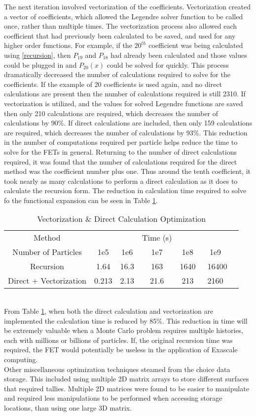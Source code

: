 \documentclass[10tma4paper]{article}
\begin{document}
The next iteration involved vectorization of the coefficients. Vectorization created a vector of coefficients, which allowed the Legendre solver function to be called once, rather than multiple times. The vectorization process also allowed each coefficient that had previously been calculated to be saved, and used for any higher order functions. For example, if the $20^{th}$ coefficient was being calculated using \eqref{recursion}, then $P_{19}$ and $P_{18}$ had already been calculated and those values could be plugged in and $P_{20}(x)$ could be solved for quickly. This process dramatically decreased the number of calculations required to solve for the coefficients. If the example of 20 coefficients is used again, and no direct calculations are present then the number of calculations required is still 2310. If vectorization is utilized, and the values for solved Legendre functions are saved then only 210 calculations are required, which decreases the number of calculations by 90\%. If direct calculations are included, then only 159 calculations are required, which decreases the number of calculations by 93\%. This reduction in the number of computations required per particle helps reduce the time to solve for the FETs in general. Returning to the number of direct calculations required, it was found that the number of calculations required for the direct method was the coefficient number plus one. Thus around the tenth coefficient, it took nearly as many calculations to perform a direct calculation as it does to calculate the recursion form. The reduction in calculation time required to solve fo the functional expansion can be seen in Table \ref{table:vect op}.
\begin{table}[htbp!]
	\caption{Vectorization \& Direct Calculation Optimization}
	\centering
	\begin{tabular}{c c c c c c c }
		\hline
		Method & & & Time (s) & & & \\[0.5ex]
		Number of Particles& 1e5 & 1e6 & 1e7 & 1e8 & 1e9 &\\
		\hline		
		\hline
		Recursion & 1.64 & 16.3 & 163 & 1640 & ~16400 & \\
		Direct + Vectorization & 0.213 & 2.13 & 21.6 & 213 & 2160 & \\[1ex]
		\hline
	\end{tabular}
	\label{table:vect op}
\end{table}
\\
From Table \ref{table:vect op}, when both the direct calculation and vectorization are implemented the calculation time is reduced by 85\%. This reduction in time will be extremely valuable when a Monte Carlo problem requires multiple histories, each with millions or billions of particles. If, the original recursion time was required, the FET would potentially be useless in the application of Exascale computing.
\\
Other miscellaneous optimization techniques steamed from the choice data storage. This included using multiple 2D matrix arrays to store different surfaces that required tallies. Multiple 2D matrices were found to be easier to manipulate and required less manipulations to be performed when accessing storage locations, than using one large 3D matrix. 
\end{document}
